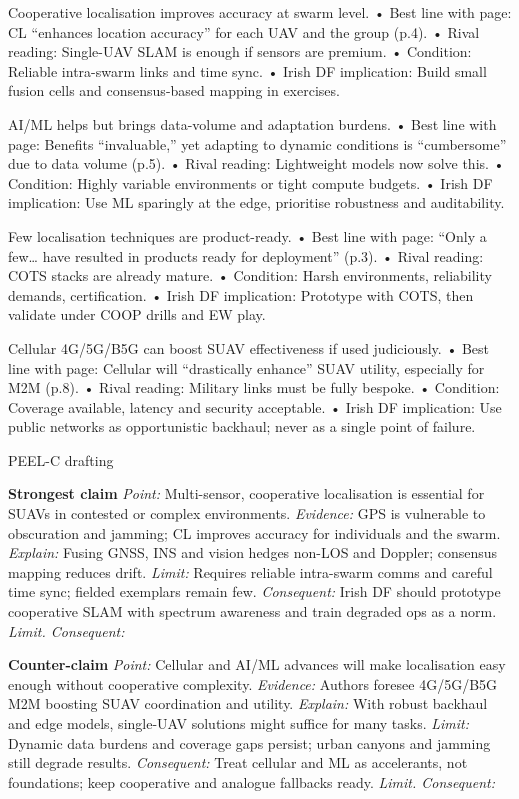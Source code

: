 Cooperative localisation improves accuracy at swarm level.
• Best line with page: CL “enhances location accuracy” for each UAV and the group (p.4).
• Rival reading: Single-UAV SLAM is enough if sensors are premium.
• Condition: Reliable intra-swarm links and time sync.
• Irish DF implication: Build small fusion cells and consensus-based mapping in exercises.

AI/ML helps but brings data-volume and adaptation burdens.
• Best line with page: Benefits “invaluable,” yet adapting to dynamic conditions is “cumbersome” due to data volume (p.5).
• Rival reading: Lightweight models now solve this.
• Condition: Highly variable environments or tight compute budgets.
• Irish DF implication: Use ML sparingly at the edge, prioritise robustness and auditability.

Few localisation techniques are product-ready.
• Best line with page: “Only a few… have resulted in products ready for deployment” (p.3).
• Rival reading: COTS stacks are already mature.
• Condition: Harsh environments, reliability demands, certification.
• Irish DF implication: Prototype with COTS, then validate under COOP drills and EW play.

Cellular 4G/5G/B5G can boost SUAV effectiveness if used judiciously.
• Best line with page: Cellular will “drastically enhance” SUAV utility, especially for M2M (p.8).
• Rival reading: Military links must be fully bespoke.
• Condition: Coverage available, latency and security acceptable.
• Irish DF implication: Use public networks as opportunistic backhaul; never as a single point of failure.

PEEL-C drafting

\textbf{Strongest claim}
\textit{Point:} Multi-sensor, cooperative localisation is essential for SUAVs in contested or complex environments.
\textit{Evidence:} GPS is vulnerable to obscuration and jamming; CL improves accuracy for individuals and the swarm.
\textit{Explain:} Fusing GNSS, INS and vision hedges non-LOS and Doppler; consensus mapping reduces drift.
\textit{Limit:} Requires reliable intra-swarm comms and careful time sync; fielded exemplars remain few.
\textit{Consequent:} Irish DF should prototype cooperative SLAM with spectrum awareness and train degraded ops as a norm. \textit{Limit. Consequent:}

\textbf{Counter-claim}
\textit{Point:} Cellular and AI/ML advances will make localisation easy enough without cooperative complexity.
\textit{Evidence:} Authors foresee 4G/5G/B5G M2M boosting SUAV coordination and utility.
\textit{Explain:} With robust backhaul and edge models, single-UAV solutions might suffice for many tasks.
\textit{Limit:} Dynamic data burdens and coverage gaps persist; urban canyons and jamming still degrade results.
\textit{Consequent:} Treat cellular and ML as accelerants, not foundations; keep cooperative and analogue fallbacks ready. \textit{Limit. Consequent:}

